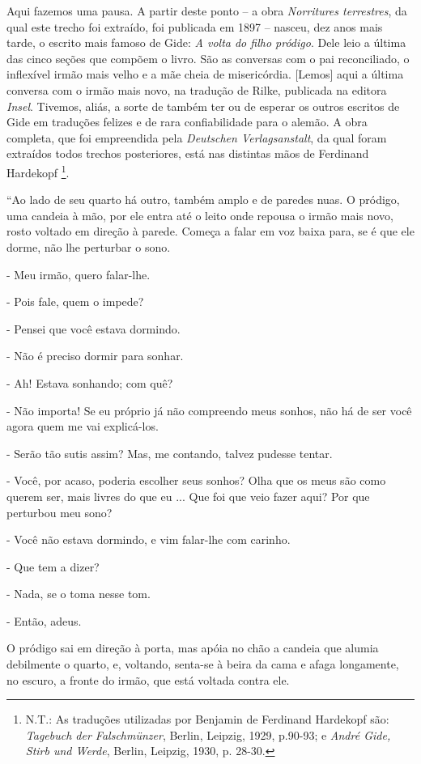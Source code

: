 Aqui fazemos uma pausa. A partir deste ponto -- a obra \emph{Norritures
terrestres}, da qual este trecho foi extraído, foi publicada em 1897 --
nasceu, dez anos mais tarde, o escrito mais famoso de Gide: \emph{A
volta do filho pródigo}. Dele leio a última das cinco seções que compõem
o livro. São as conversas com o pai reconciliado, o inflexível irmão
mais velho e a mãe cheia de misericórdia. {[}Lemos{]} aqui a última
conversa com o irmão mais novo, na tradução de Rilke, publicada na
editora \emph{Insel}. Tivemos, aliás, a sorte de também ter ou de
esperar os outros escritos de Gide em traduções felizes e de rara
confiabilidade para o alemão. A obra completa, que foi empreendida pela
\emph{Deutschen Verlagsanstalt}, da qual foram extraídos todos trechos
posteriores, está nas distintas mãos de Ferdinand Hardekopf \footnote{N.T.:
  As traduções utilizadas por Benjamin de Ferdinand Hardekopf são:
  \emph{Tagebuch der Falschmünzer}, Berlin, Leipzig, 1929, p.90-93; e
  \emph{André Gide, Stirb und Werde}, Berlin, Leipzig, 1930, p. 28-30.}.

``Ao lado de seu quarto há outro, também amplo e de paredes nuas. O
pródigo, uma candeia à mão, por ele entra até o leito onde repousa o
irmão mais novo, rosto voltado em direção à parede. Começa a falar em
voz baixa para, se é que ele dorme, não lhe perturbar o sono.

- Meu irmão, quero falar-lhe.

- Pois fale, quem o impede?

- Pensei que você estava dormindo.

- Não é preciso dormir para sonhar.

- Ah! Estava sonhando; com quê?

- Não importa! Se eu próprio já não compreendo meus sonhos, não há de
ser você agora quem me vai explicá-los.

- Serão tão sutis assim? Mas, me contando, talvez pudesse tentar.

- Você, por acaso, poderia escolher seus sonhos? Olha que os meus são
como querem ser, mais livres do que eu ... Que foi que veio fazer aqui?
Por que perturbou meu sono?

- Você não estava dormindo, e vim falar-lhe com carinho.

- Que tem a dizer?

- Nada, se o toma nesse tom.

- Então, adeus.

O pródigo sai em direção à porta, mas apóia no chão a candeia que alumia
debilmente o quarto, e, voltando, senta-se à beira da cama e afaga
longamente, no escuro, a fronte do irmão, que está voltada contra ele.

